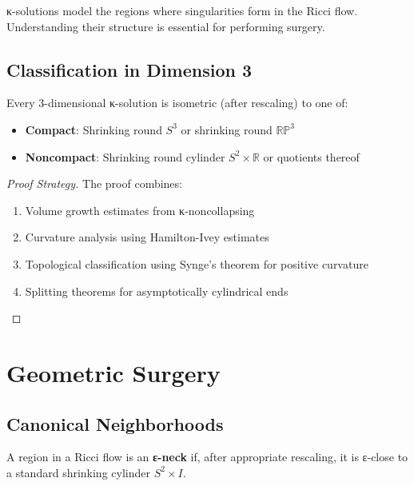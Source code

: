 κ-solutions model the regions where singularities form in the Ricci flow. Understanding their structure is essential for performing surgery.

\section{Classification in Dimension 3}

\begin{theorem}
\label{thm:kappa_classification}
\leanok
{}
Every 3-dimensional κ-solution is isometric (after rescaling) to one of:
\begin{itemize}
\item \textbf{Compact}: Shrinking round $S^3$ or shrinking round $\mathbb{RP}^3$
\item \textbf{Noncompact}: Shrinking round cylinder $S^2 \times \mathbb{R}$ or quotients thereof
\end{itemize}
\end{theorem}

\begin{proof}[Proof Strategy]
The proof combines:
\begin{enumerate}
\item Volume growth estimates from κ-noncollapsing
\item Curvature analysis using Hamilton-Ivey estimates
\item Topological classification using Synge's theorem for positive curvature
\item Splitting theorems for asymptotically cylindrical ends
\end{enumerate}
\end{proof}

\chapter{Geometric Surgery}
\label{chap:surgery}

\section{Canonical Neighborhoods}

\begin{definition}[ε-Neck]
\label{def:epsilon_neck}
\leanok
{}
A region in a Ricci flow is an \textbf{ε-neck} if, after appropriate rescaling, it is ε-close to a standard shrinking cylinder $S^2 \times I$.
\end{definition}


